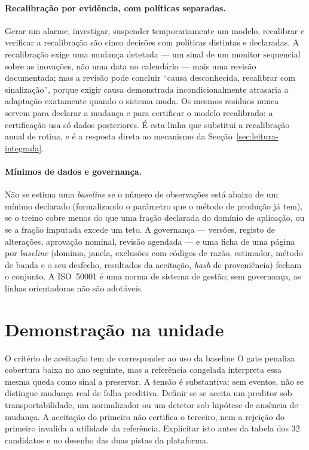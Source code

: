 \paragraph{Recalibração por evidência, com políticas separadas.} Gerar um
alarme, investigar, suspender temporariamente um modelo, recalibrar e
verificar a recalibração são cinco decisões com políticas distintas e
declaradas. A recalibração exige uma mudança detetada --- um sinal de um
monitor sequencial~\cite{Page1954,Lai1995} sobre as inovações, não uma data
no calendário --- mais
uma revisão documentada; mas a revisão pode concluir ``causa desconhecida,
recalibrar com sinalização'', porque exigir causa demonstrada
incondicionalmente atrasaria a adaptação exatamente quando o sistema muda.
Os mesmos resíduos nunca servem para declarar a mudança e para certificar o
modelo recalibrado: a certificação usa só dados posteriores. É esta linha
que substitui a recalibração anual de rotina, e é a resposta direta ao
mecanismo da Secção~\ref{sec:leitura-integrada}.

\paragraph{Mínimos de dados e governança.} Não se estima uma \emph{baseline}
se o número de observações está abaixo de um mínimo declarado (formalizando
o parâmetro que o método de produção já tem), se o treino cobre menos do que
uma fração declarada do domínio de aplicação, ou se a fração imputada excede
um teto. A governança --- versões, registo de alterações, aprovação nominal,
revisão agendada --- e uma ficha de uma página por \emph{baseline} (domínio,
janela, exclusões com códigos de razão, estimador, método de banda e o seu
desfecho, resultados da aceitação, \emph{hash} de proveniência) fecham o
conjunto. A ISO~50001 é uma norma de sistema de gestão; sem governança, as
linhas orientadoras não são adotáveis.

\section{Demonstração na unidade}
\label{sec:demonstracao}
{O critério de aceitação tem de corresponder ao uso da baseline}
{O gate penaliza cobertura baixa no ano seguinte, mas a referência
congelada interpreta essa mesma queda como sinal a preservar. A tensão
é substantiva: sem eventos, não se distingue mudança real de falha
preditiva. Definir se se aceita um preditor sob transportabilidade, um
normalizador ou um detetor sob hipótese de ausência de mudança.
A aceitação do primeiro não certifica o terceiro, nem a rejeição do
primeiro invalida a utilidade da referência. Explicitar isto antes da
tabela dos 32 candidatos e no desenho das duas pistas da plataforma.}%

